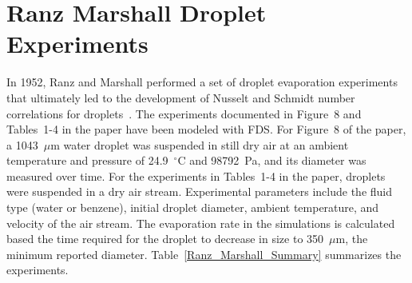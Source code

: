 \section{Ranz Marshall Droplet Experiments}
\label{Ranz_Marshall_Description}

In 1952, Ranz and Marshall performed a set of droplet evaporation experiments that ultimately led to the development of Nusselt and Schmidt number correlations for droplets~\cite{Ranz}. The experiments documented in Figure~8 and Tables~1-4 in the paper have been modeled with FDS. For Figure~8 of the paper, a 1043~$\mu$m water droplet was suspended in still dry air at an ambient temperature and pressure of 24.9~$^\circ$C and 98792~Pa, and its diameter was measured over time. For the experiments in Tables~1-4 in the paper, droplets were suspended in a dry air stream. Experimental parameters include the fluid type (water or benzene), initial droplet diameter, ambient temperature, and velocity of the air stream. The evaporation rate in the simulations is calculated based the time required for the droplet to decrease in size to 350~$\mu$m, the minimum reported diameter. Table~\ref{Ranz_Marshall_Summary} summarizes the experiments.

